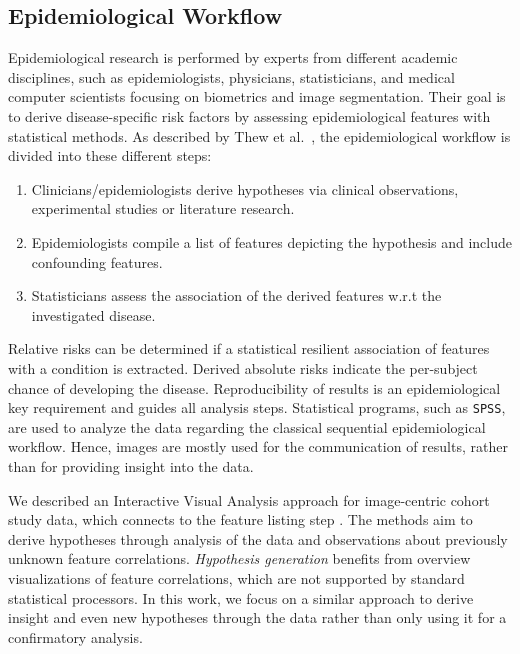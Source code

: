\documentclass[journal]{style/vgtc} 			          %
\begin{document}
\subsection{Epidemiological Workflow} \label{sec:EpidemiologicalWorkflow}
Epidemiological research is performed by experts from different academic disciplines, such as epidemiologists, physicians, statisticians, and medical computer scientists focusing on biometrics and image segmentation.
Their goal is to derive disease-specific risk factors by assessing epidemiological features with statistical methods.
As described by Thew et al.~\cite{Thew2009}, the epidemiological workflow is divided into these different steps:
\begin{enumerate}
	\item Clinicians/epidemiologists derive hypotheses via clinical observations, experimental studies or literature research.
	\item Epidemiologists compile a list of features depicting the hypothesis and include confounding features.
	\item Statisticians assess the association of the derived features w.r.t the investigated disease.
\end{enumerate}
Relative risks can be determined if a statistical resilient association of features with a condition is extracted.
Derived absolute risks indicate the per-subject chance of developing the disease.
Reproducibility of results is an epidemiological key requirement and guides all analysis steps.
Statistical programs, such as \texttt{SPSS}, are used to analyze the data regarding the classical sequential epidemiological workflow.
Hence, images are mostly used for the communication of results, rather than for providing insight into the data.

We described an Interactive Visual Analysis approach for image-centric cohort study data, which connects to the feature listing step \cite{Klemm2014VIS}.
The methods aim to derive hypotheses through analysis of the data and observations about previously unknown feature correlations.
\emph{Hypothesis generation} benefits from overview visualizations of feature correlations, which are not supported by standard statistical processors.
In this work, we focus on a similar approach to derive insight and even new hypotheses through the data rather than only using it for a confirmatory analysis.
\end{document}
